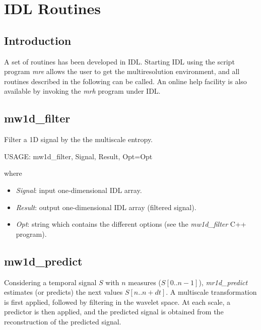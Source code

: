 
\section{IDL Routines}
\label{ch_mr2_idl}

\subsection{Introduction}
A set of routines has been developed in IDL. Starting IDL using
the script program {\em mre} allows the user to get the multiresolution
environment, and all routines
described in the following can be called. An online help facility 
is also available by
invoking the {\em mrh} program under IDL.

\subsection{mw1d\_filter}
Filter a 1D signal by the the multiscale entropy.
{\bf
\begin{center}
     USAGE: mw1d\_filter, Signal, Result, Opt=Opt
\end{center}}
where 
\begin{itemize}
\item {\em Signal}: input  one-dimensional IDL array.
\item {\em Result}: output one-dimensional IDL array (filtered signal).
\item {\em Opt}:  string which contains the different options 
(see the {\em mw1d\_filter} C++  program).
\end{itemize}

\subsection{mw1d\_predict}
Considering a temporal signal $S$ with $n$ measures ($S[0..n-1]$), 
 {\em mr1d\_predict} estimates (or predicts) the next values $S[n .. n+dt]$.
A multiscale transformation is first applied, followed by filtering
in the wavelet space. At each scale, a predictor is then applied,
and the predicted signal is obtained from the reconstruction of
the predicted signal. 

